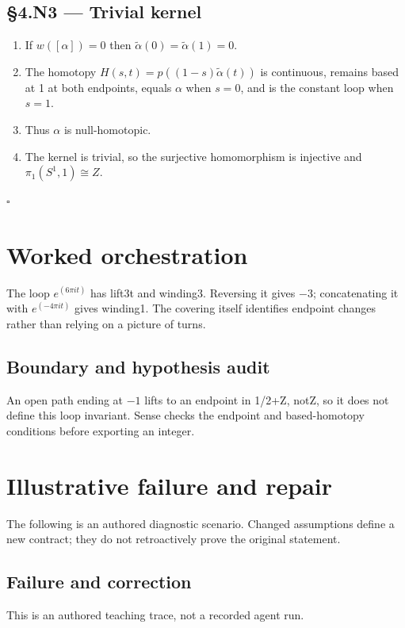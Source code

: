 \documentclass[preprint,12pt,aps,pra,showkeys,amsmath,amssymb,superscriptaddress,floatfix]{revtex4-2}
\theoremstyle{definition}
\theoremstyle{remark}
\begin{document}
\subsection{§4.N3 --- Trivial kernel}\label{n3-trivial-kernel}

\begin{enumerate}
\def\labelenumi{\arabic{enumi}.}
\item
  If \(w([\alpha ])=0\) then
  \(\widetilde{\alpha}(0)=\widetilde{\alpha}(1)=0\).
\item
  The homotopy \(H(s,t)=p((1-s)\widetilde{\alpha}(t))\) is continuous,
  remains based at 1 at both endpoints, equals \(\alpha\) when \(s=0\),
  and is the constant loop when \(s=1\).
\item
  Thus \(\alpha\) is null-homotopic.
\item
  The kernel is trivial, so the surjective homomorphism is injective and
  \(\pi _{1}(S^{1},1)\cong Z\).
\end{enumerate}

\hfill$\square$

\section{Worked orchestration}

The loop \(e^{(6\pi it)}\) has lift3t and winding3. Reversing it gives
\(-3\); concatenating it with \(e^{(-4\pi it)}\) gives winding1. The
covering itself identifies endpoint changes rather than relying on a
picture of turns.

\subsection{Boundary and hypothesis audit}

An open path ending at \(-1\) lifts to an endpoint in 1/2+Z, notZ, so it
does not define this loop invariant. Sense checks the endpoint and
based-homotopy conditions before exporting an integer.

\section{Illustrative failure and repair}

The following is an authored diagnostic scenario. Changed assumptions
define a new contract; they do not retroactively prove the original
statement.

\subsection{Failure and correction}
This is an authored teaching trace, not a recorded agent run.
\end{document}
